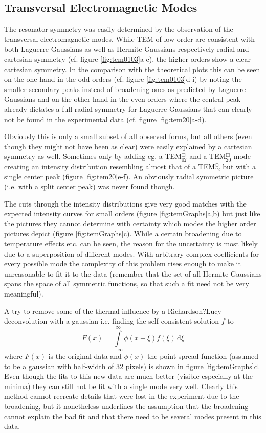\documentclass[a4paper]{scrartcl}
\numberwithin{equation}{section}
\numberwithin{figure}{section}
\numberwithin{table}{section}
\newcommand{\eq}[2]{\begin{equation}#1\label{#2}\end{equation}}
\begin{document}
\subsection{Transversal Electromagnetic Modes}
The resonator symmetry was easily determined by the observation of the transversal electromagnetic modes. While TEM of low order are consistent with both Laguerre-Gaussians as well as Hermite-Gaussians respectively radial and cartesian symmetry (cf. figure \ref{fig:tem0103}a-c), the higher orders show a clear cartesian symmetry. In the comparison with the theoretical plots this can be seen on the one hand in the odd orders (cf. figure \ref{fig:tem0103}d-i) by noting the smaller secondary peaks instead of broadening ones as predicted by Laguerre-Gaussians and on the other hand in the even orders where the central peak already dictates a full radial symmetry for Laguerre-Gaussians that can clearly not be found in the experimental data (cf. figure \ref{fig:tem20}a-d).

Obviously this is only a small subset of all observed forms, but all others (even though they might not have been as clear) were easily explained by a cartesian symmetry as well. Sometimes only by adding eg. a TEM$^\Box_{02}$ and a TEM$^\Box_{20}$ mode creating an intensity distribution resembling almost that of a TEM$^\bigcirc_{12}$ but with a single center peak (figure \ref{fig:tem20}e-f). An obviously radial symmetric picture (i.e. with a split center peak) was never found though.

The cuts through the intensity distributions give very good matches with the expected intensity curves for small orders (figure \ref{fig:temGraphs}a,b) but just like the pictures they cannot determine with certainty which modes the higher order pictures depict (figure \ref{fig:temGraphs}c). While a certain broadening due to temperature effects etc. can be seen, the reason for the uncertainty is most likely due to a superposition of different modes. With arbitrary complex coefficients for every possible mode the complexity of this problem rises enough to make it unreasonable to fit it to the data (remember that the set of all Hermite-Gaussians spans the space of all symmetric functions, so that such a fit need not be very meaningful).

A try to remove some of the thermal influence by a Richardson?Lucy deconvolution with a gaussian i.e. finding the self-consistent solution $f$ to 
\eq{F(x)=\int\limits_{-\infty}^{\infty}\!\!\phi(x-\xi) f(\xi) \, \text{d}\xi}{}
where $F(x)$ is the original data and $\phi(x)$ the point spread function (assumed to be a gaussian with half-width of 32 pixels) is shown in figure \ref{fig:temGraphs}d. Even though the fits to this new data are much better (visible especially at the minima) they can still not be fit with a single mode very well. Clearly this method cannot recreate details that were lost in the experiment due to the broadening, but it nonetheless underlines the assumption that the broadening cannot explain the bad fit and that there need to be several modes present in this data.
\end{document}
